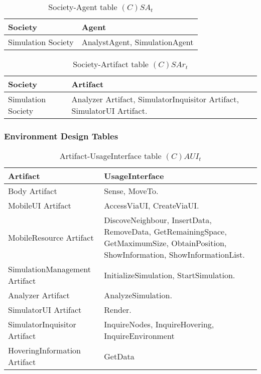 \begin{table}[H]
	\centering
	\begin{tabular}{|p{4cm}|p{8cm}|}
			\hline
			\textbf{Society} & \textbf{Agent} \\
			\hline
			Simulation Society & AnalystAgent, SimulationAgent\\
			\hline
		\end{tabular}
	\caption{Society-Agent table $(C)SA_t$}
	\label{tab:csat}
\end{table}

\begin{table}[H]
	\centering
	\begin{tabular}{|p{4cm}|p{8cm}|}
			\hline
			\textbf{Society} & \textbf{Artifact} \\
			\hline
			Simulation Society & Analyzer Artifact, SimulatorInquisitor Artifact,
			SimulatorUI Artifact. \\
			\hline
		\end{tabular}
	\caption{Society-Artifact table $(C)SAr_t$}
	\label{tab:csart}
\end{table}

\subsubsection{Environment Design Tables}

\begin{table}[H]
	\centering
	\begin{tabular}{|p{4cm}|p{8cm}|}
			\hline
			\textbf{Artifact} & \textbf{UsageInterface} \\
			\hline
			Body Artifact & Sense, MoveTo. \\
			\hline
			MobileUI Artifact & AccessViaUI, CreateViaUI. \\
			\hline
			MobileResource Artifact & DiscoveNeighbour, InsertData, RemoveData,
			GetRemainingSpace, GetMaximumSize, ObtainPosition, ShowInformation,
			ShowInformationList. \\
			\hline
			SimulationManagement Artifact & InitializeSimulation, StartSimulation.
			\\
			\hline
			Analyzer Artifact & AnalyzeSimulation. \\
			\hline
			SimulatorUI Artifact & Render. \\
			\hline
			SimulatorInquisitor Artifact & InquireNodes, InquireHovering,
			InquireEnvironment \\
			\hline
			HoveringInformation Artifact & GetData \\
			\hline
		\end{tabular}
	\caption{Artifact-UsageInterface table $(C)AUI_t$}
	\label{tab:cauit}
\end{table}

